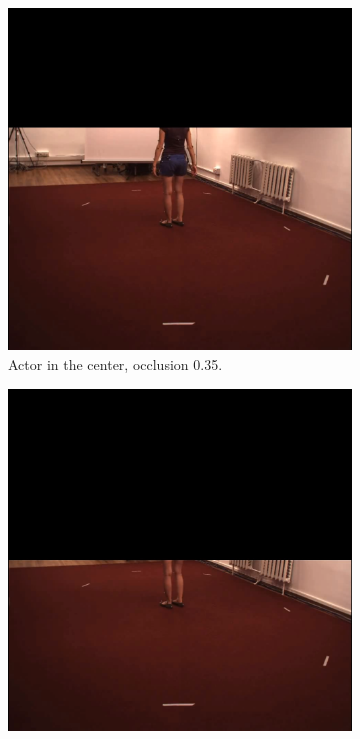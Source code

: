 \documentclass[runningheads]{llncs}
\begin{document}
\begin{figure}
  \centering
  \begin{subfigure}[t]{0.24\textwidth}
    \centering
    \includegraphics[width=\textwidth]{assets/h35_S1_Directions 1.54138969.png}
    \caption{Actor in the center, occlusion 0.35.}
    \label{fig: actor center, occlusion ratio 35}
  \end{subfigure}
  \begin{subfigure}[t]{0.24\textwidth}
    \centering
    \includegraphics[width=\textwidth]{assets/h50_S1_Directions 1.54138969.png}

\end{subfigure}
\end{figure}
\end{document}
